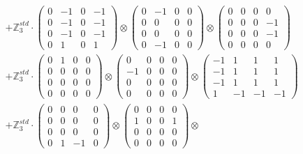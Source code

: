 \documentclass{article}
\begin{document}
{\begin{align}
        &+ \label{Rs16-Rc11-Solution-9-c22} \mathbb{Z}_3^{std} \cdot 
            \begin{pmatrix} 0 & -1 & 0 & -1 \\ 0 & -1 & 0 & -1 \\ 0 & -1 & 0 & -1 \\ 0 & 1 & 0 & 1 \end{pmatrix} \otimes 
            \begin{pmatrix} 0 & -1 & 0 & 0 \\ 0 & 0 & 0 & 0 \\ 0 & 0 & 0 & 0 \\ 0 & -1 & 0 & 0 \end{pmatrix} \otimes 
            \begin{pmatrix} 0 & 0 & 0 & 0 \\ 0 & 0 & 0 & -1 \\ 0 & 0 & 0 & -1 \\ 0 & 0 & 0 & 0 \end{pmatrix} \\ 
        &+ \label{Rs16-Rc11-Solution-9-c23} \mathbb{Z}_3^{std} \cdot 
            \begin{pmatrix} 0 & 1 & 0 & 0 \\ 0 & 0 & 0 & 0 \\ 0 & 0 & 0 & 0 \\ 0 & 0 & 0 & 0 \end{pmatrix} \otimes 
            \begin{pmatrix} 0 & 0 & 0 & 0 \\ -1 & 0 & 0 & 0 \\ 0 & 0 & 0 & 0 \\ 0 & 0 & 0 & 0 \end{pmatrix} \otimes 
            \begin{pmatrix} -1 & 1 & 1 & 1 \\ -1 & 1 & 1 & 1 \\ -1 & 1 & 1 & 1 \\ 1 & -1 & -1 & -1 \end{pmatrix} \\ 
        &+ \label{Rs16-Rc11-Solution-9-c24} \mathbb{Z}_3^{std} \cdot 
            \begin{pmatrix} 0 & 0 & 0 & 0 \\ 0 & 0 & 0 & 0 \\ 0 & 0 & 0 & 0 \\ 0 & 1 & -1 & 0 \end{pmatrix} \otimes 
            \begin{pmatrix} 0 & 0 & 0 & 0 \\ 1 & 0 & 0 & 1 \\ 0 & 0 & 0 & 0 \\ 0 & 0 & 0 & 0 \end{pmatrix} \otimes 

\end{align}}
\end{document}
